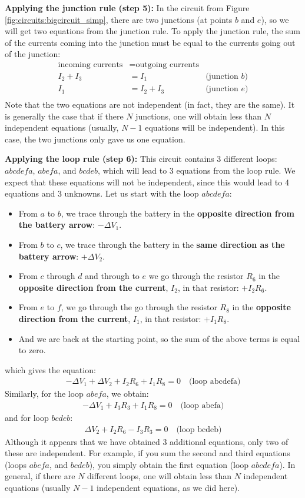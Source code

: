 \textbf{Applying the junction rule (step 5): }In the circuit from Figure \ref{fig:circuits:bigcircuit_simp}, there are two junctions (at points $b$ and $e$), so we will get two equations from the junction rule. To apply the junction rule, the sum of the currents coming into the junction must be equal to the currents going out of the junction:
\begin{align*}
\text{incoming currents}&=\text{outgoing currents}&\\
I_2+I_3 &= I_1 \quad &\text{(junction $b$)}\\
I_1 &= I_2+I_3 \quad &\text{(junction $e$)}\\
\end{align*}
Note that the two equations are not independent (in fact, they are the same). It is generally the case that if there $N$ junctions, one will obtain less than $N$ independent equations (usually, $N-1$ equations will be independent). In this case, the two junctions only gave us one equation. 

\textbf{Applying the loop rule (step 6): } This circuit contains 3 different loops: $abcdefa$, $abefa$, and $bcdeb$, which will lead to 3 equations from the loop rule. We expect that these equations will not be independent, since this would lead to 4 equations and 3 unknowns. Let us start with the loop $abcdefa$:
\begin{itemize}
\item From $a$ to $b$, we trace through the battery in the \textbf{opposite direction from the battery arrow}: $-\Delta V_1$.
\item From $b$ to $c$, we trace through the battery in the \textbf{same direction as the battery arrow}: $+\Delta V_2$.
\item From $c$ through $d$ and through to $e$ we go through the resistor $R_6$ in the \textbf{opposite direction from the current}, $I_2$, in that resistor: $+I_2R_6$.
\item From $e$ to $f$, we go through the go through the resistor $R_8$ in the \textbf{opposite direction from the current}, $I_1$, in that resistor: $+I_1R_8$.
\item And we are back at the starting point, so the sum of the above terms is equal to zero.
\end{itemize}
which gives the equation:
\begin{align*}
-\Delta V_1+\Delta V_2+I_2R_6+I_1R_8=0\quad\text{(loop abcdefa)}
\end{align*}
Similarly, for the loop $abefa$, we obtain:
\begin{align*}
-\Delta V_1+I_3R_3+I_1R_8=0\quad\text{(loop abefa)}
\end{align*}
and for loop $bcdeb$:
\begin{align*}
\Delta V_2+I_2R_6-I_3R_3=0\quad\text{(loop bcdeb)}
\end{align*}
Although it appears that we have obtained 3 additional equations, only two of these are independent. For example, if you sum the second and third equations (loops $abefa$, and $bcdeb$), you simply obtain the first equation (loop $abcdefa$). In general, if there are $N$ different loops, one will obtain less than $N$ independent equations (usually $N-1$ independent equations, as we did here).

